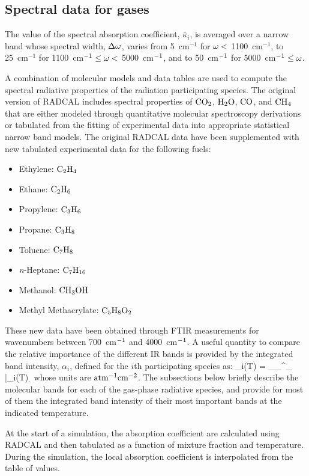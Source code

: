 \subsection{Spectral data for gases}
\label{gas_spectra}

The value of the spectral absorption coefficient, $\bar{\kappa}_i$, is averaged over a narrow band whose spectral width, $\Delta \omega$, varies from
5~cm$^{-1}$ for $\omega < $ 1100~cm$^{-1}$, to 25~cm$^{-1}$ for 1100~cm$^{-1} \leq \omega < $ 5000~cm$^{\rm -1}$,
and to 50~cm$^{\rm -1}$ for 5000~cm$^{\rm -1}\leq \omega$.

A combination of molecular models and data tables are used to compute the spectral radiative
properties of the radiation participating species.
The original version of RADCAL includes spectral properties of $\rm CO_2$, $\rm H_2O$, $\rm CO$, and
$\rm CH_4$ that are either modeled through quantitative molecular spectroscopy derivations
or tabulated from the fitting of experimental data into appropriate statistical narrow band models.
The original RADCAL data have been supplemented with new tabulated experimental data
for the following fuels:
\begin{itemize}
  \item Ethylene:  $\rm C_2H_4$
  \item Ethane:    $\rm C_2H_6$
  \item Propylene: $\rm C_3H_6$
  \item Propane:   $\rm C_3H_8$
  \item Toluene:   $\rm C_7H_8$
  \item \textit{n}-Heptane: $\rm C_7H_{16}$
  \item Methanol:  $\rm CH_3OH$
  \item Methyl Methacrylate: $\rm C_5H_8O_2$
\end{itemize}
These new data have been obtained through FTIR measurements for wavenumbers between 700~cm$\rm ^{-1}$ and 4000~cm$\rm ^{-1}$.
A useful quantity to compare the relative importance of the different IR bands is provided by the integrated band intensity,
$\alpha_i$, defined for the $i$th participating species as:
\be
  \alpha_i(T) = \displaystyle\int_{\om_{\min}}^{\om_{\max}} \bar{\kappa}_i(T) \; \d \om
\ee
whose units are $\rm {atm^{-1} cm^{-2}}$. The subsections below briefly describe the molecular bands for each of the gas-phase radiative species, and provide for most of them the integrated band intensity of their most important bands at the indicated temperature.

At the start of a simulation, the absorption coefficient are calculated using RADCAL and then tabulated as a function of mixture fraction and temperature. During the simulation, the local absorption coefficient is interpolated from the table of values.

